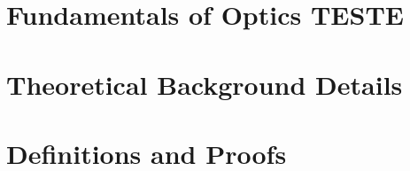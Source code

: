 \documentclass[mestrado, pre-defesa]{packages/icmc}
\begin{document}
% 

\postextual



\begin{apendicesenv}
    \chapter{Fundamentals of Optics TESTE}
    \label{chapter:fundamentals-of-optics}
    
    
    \chapter{Theoretical Background Details}
    \label{chapter:theoretical-background-details}
    
    
    \chapter{Definitions and Proofs}
    \label{chapter:definitions-and-proofs}
    
\end{apendicesenv}
\end{document}
